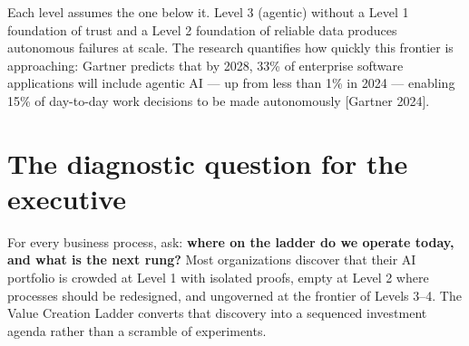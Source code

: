 Each level assumes the one below it. Level 3 (agentic) without a Level 1
foundation of trust and a Level 2 foundation of reliable data produces
autonomous failures at scale. The research quantifies how quickly this frontier
is approaching: Gartner predicts that by 2028, 33\% of enterprise software
applications will include agentic AI — up from less than 1\% in 2024 —
enabling 15\% of day-to-day work decisions to be made autonomously
[Gartner 2024].

\section{The diagnostic question for the executive}

For every business process, ask: \textbf{where on the ladder do we operate
today, and what is the next rung?} Most organizations discover that their AI
portfolio is crowded at Level 1 with isolated proofs, empty at Level 2 where
processes should be redesigned, and ungoverned at the frontier of Levels 3--4.
The Value Creation Ladder converts that discovery into a sequenced investment
agenda rather than a scramble of experiments.
